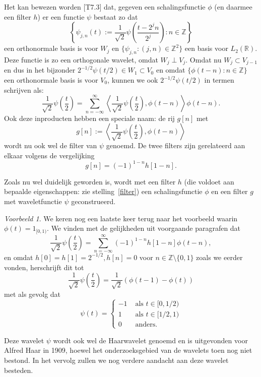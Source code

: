 \documentclass[11pt]{report}
\newcommand{\R}{\mathbb{R}}
\newcommand{\Z}{\mathbb{Z}}
\theoremstyle{plain}
\theoremstyle{remark}
\newtheorem*{voorbeeld}{Voorbeeld}
\begin{document}
Het kan bewezen worden \cite{mallat}[T7.3] dat, gegeven een schalingsfunctie $\phi$ (en daarmee een filter $h$) er een functie $\psi$ bestaat zo dat 
\[
	\left\{ \psi_{j,n}(t) := \frac{1}{\sqrt{2}} \psi\left(\frac{t-2^jn}{2^j}\right) : n \in \Z \right\}
\] een orthonormale basis is voor $W_j$ en $\{ \psi_{j,n}: (j,n) \in \Z^2 \}$ een basis voor $L_2(\R)$. Deze functie is zo een orthogonale wavelet, omdat $W_j \perp V_j$.
Omdat nu $W_j \subset V_{j-1}$ en dus in het bijzonder $2^{-1/2} \psi(t/2) \in W_1 \subset V_0$ en omdat $\{ \phi(t-n): n \in \Z \}$ een orthonormale basis is voor $V_0$, kunnen we ook $2^{-1/2}\psi(t/2)$ in termen schrijven als:
\[
	\frac{1}{\sqrt{2}} \psi\left(\frac{t}{2}\right) = \sum_{n=-\infty}^{\infty} \left\langle \frac{1}{\sqrt{2}} \psi\left(\frac{t}{2}\right), \phi(t-n) \right\rangle \phi(t-n).
\]
Ook deze inproducten hebben een speciale naam: de rij $g[n]$ met
\[
	g[n] := \left\langle \frac{1}{\sqrt{2}} \psi\left(\frac{t}{2}\right), \phi(t-n) \right\rangle
\]
wordt nu ook wel de filter van $\psi$ genoemd. De twee filters zijn gerelateerd aan elkaar volgens de vergelijking
\[
	g[n] = (-1)^{1-n}h[1-n].
\]

Zoals nu wel duidelijk geworden is, wordt met een filter $h$ (die voldoet aan bepaalde eigenschappen: zie stelling~\ref{filter}) een schalingsfunctie $\phi$ en een filter $g$ met waveletfunctie $\psi$ geconstrueerd.

\begin{voorbeeld}
We keren nog een laatste keer terug naar het voorbeeld waarin $\phi(t) = 1_{[0,1)}$. We vinden met de gelijkheden uit voorgaande paragrafen dat
\[
\frac{1}{\sqrt{2}} \psi\left(\frac{t}{2}\right) = \sum_{n=-\infty}^{\infty} (-1)^{1-n}h[1-n] \phi(t-n),
\]
en omdat $h[0] = h[1] = 2^{-1/2}, h[n] = 0$ voor $n \in \Z \setminus \{0,1\}$ zoals we eerder vonden, herschrijft dit tot
\[
\frac{1}{\sqrt{2}} \psi\left(\frac{t}{2}\right) = \frac{1}{\sqrt{2}}\left(\phi(t-1) - \phi(t)\right)
\]
met als gevolg dat
\[
	\psi(t) = \begin{cases} -1 & \text{ als } t \in [0,1/2) \\ 1 & \text{ als } t \in [1/2,1) \\ 0 & \text{ anders.} \end{cases}
\]

Deze wavelet $\psi$ wordt ook wel de Haarwavelet genoemd en is uitgevonden voor Alfred Haar in 1909, hoewel het onderzoeksgebied van de wavelets toen nog niet bestond. In het vervolg zullen we nog verdere aandacht aan deze wavelet besteden.
\end{voorbeeld}
\end{document}
